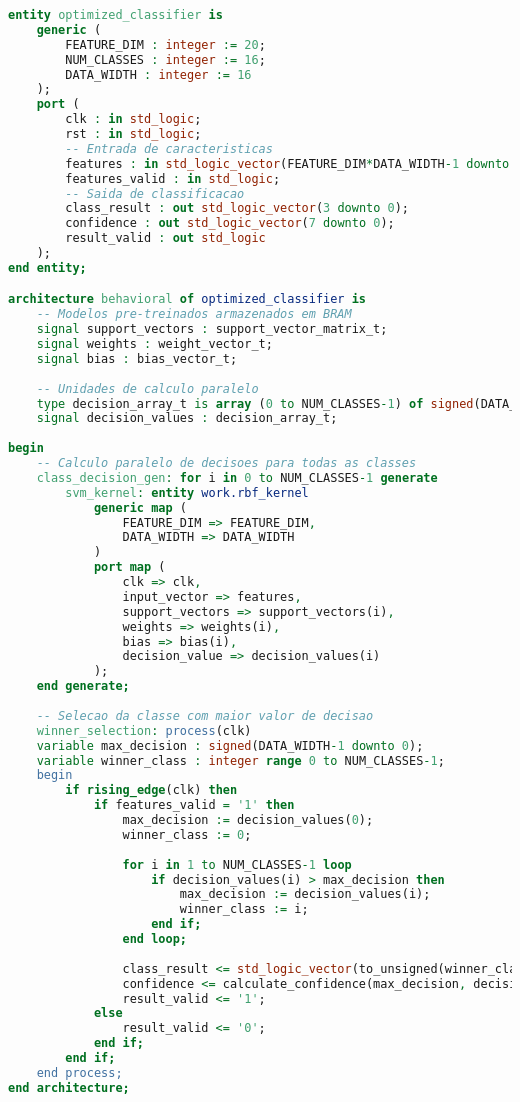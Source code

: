\begin{lstlisting}[language=VHDL]
entity optimized_classifier is
    generic (
        FEATURE_DIM : integer := 20;
        NUM_CLASSES : integer := 16;
        DATA_WIDTH : integer := 16
    );
    port (
        clk : in std_logic;
        rst : in std_logic;
        -- Entrada de caracteristicas
        features : in std_logic_vector(FEATURE_DIM*DATA_WIDTH-1 downto 0);
        features_valid : in std_logic;
        -- Saida de classificacao
        class_result : out std_logic_vector(3 downto 0);
        confidence : out std_logic_vector(7 downto 0);
        result_valid : out std_logic
    );
end entity;

architecture behavioral of optimized_classifier is
    -- Modelos pre-treinados armazenados em BRAM
    signal support_vectors : support_vector_matrix_t;
    signal weights : weight_vector_t;
    signal bias : bias_vector_t;
    
    -- Unidades de calculo paralelo
    type decision_array_t is array (0 to NUM_CLASSES-1) of signed(DATA_WIDTH-1 downto 0);
    signal decision_values : decision_array_t;
    
begin
    -- Calculo paralelo de decisoes para todas as classes
    class_decision_gen: for i in 0 to NUM_CLASSES-1 generate
        svm_kernel: entity work.rbf_kernel
            generic map (
                FEATURE_DIM => FEATURE_DIM,
                DATA_WIDTH => DATA_WIDTH
            )
            port map (
                clk => clk,
                input_vector => features,
                support_vectors => support_vectors(i),
                weights => weights(i),
                bias => bias(i),
                decision_value => decision_values(i)
            );
    end generate;
    
    -- Selecao da classe com maior valor de decisao
    winner_selection: process(clk)
    variable max_decision : signed(DATA_WIDTH-1 downto 0);
    variable winner_class : integer range 0 to NUM_CLASSES-1;
    begin
        if rising_edge(clk) then
            if features_valid = '1' then
                max_decision := decision_values(0);
                winner_class := 0;
                
                for i in 1 to NUM_CLASSES-1 loop
                    if decision_values(i) > max_decision then
                        max_decision := decision_values(i);
                        winner_class := i;
                    end if;
                end loop;
                
                class_result <= std_logic_vector(to_unsigned(winner_class, 4));
                confidence <= calculate_confidence(max_decision, decision_values);
                result_valid <= '1';
            else
                result_valid <= '0';
            end if;
        end if;
    end process;
end architecture;
\end{lstlisting}

